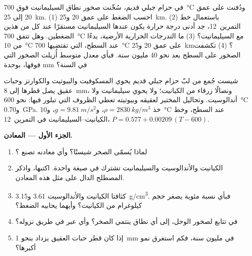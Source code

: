 \begin{exercise}[$\star\star\star$]\label{exo:g12:metamorphic-rocks:15}
في حزام جبلي قديم، سُخّنت صخور نطاق السيليمانيت فوق
\qty{700}{\celsius} ودُفنت على عمق 20 إلى \qty{25}{km}. (1) احسب
الضغط على عمق 20 و\qty{25}{km}. (2) باستعمال خط
التمرين~12، جد أدنى درجة حرارة يكون عندها السيليمانيت مستقرًا عند
كل من هذين الضغطين. وهل تتفق \qty{700}{\celsius} مع السيليمانيت؟
(3) ما التدرجات الحرارية الأرضية، بدءًا من \qty{10}{\celsius} عند السطح، التي تقتضيها
\qty{700}{\celsius} على عمق 20 و\qty{25}{km}؟ (4) تكشفت الصخور
على السطح بعد نحو 40 مليون سنة. فبأي معدل متوسط أُزيلت
الصخور التي فوقها، بوحدة \unit{mm} في السنة؟
\end{exercise}

\begin{problem}
\label{pb:g12:metamorphic-rocks:1}
شيست جُمع من لبّ حزام جبلي قديم يحوي المسكوفيت
والبيوتيت والكوارتز وحبات عقيق يصل قطرها إلى \qty{8}{mm}، ونصالًا زرقاء من
الكيانيت؛ ولا يحوي سيليمانيت ولا أندالوسيت. وتحاليل المختبر
لعقيقه وبيوتيته تعطي الظروف التي تبلور فيها:
نحو \qty{600}{\celsius} و\qty{0.70}{GPa}. خذ $\rho =
\qty{2830}{kg/m^3}$، و$g = \qty{9.81}{m/s^2}$، و\qty{10}{\celsius} عند
السطح، وخط الكيانيت--السيليمانيت في التمرين~12، $P = 0.577 +
0.00209\,(T - 600)$.

\medskip
\noindent\textbf{الجزء الأول --- المعادن.}
\begin{enumerate}
  \item لماذا يُسمّى الصخر شيستًا؟ وأي معادنه تصنع
        ؟
  \item الكيانيت والأندالوسيت والسيليمانيت تشترك في صيغة واحدة. اكتبها،
        واذكر المصطلح الدال على مثل هذه المعادن.
  \item كثافتا الكيانيت والأندالوسيت \num{3.61}
        و\qty{3.15}{g/cm^3}. فبأي نسبة مئوية يصغر حجم كيلوغرام من
        الكيانيت؟ وأيهما يحابيه الضغط؟
  \item في تتابع  لصخور الوحل، إلى أي نطاق
        ينتمي الصخر؟ وأي  عبر في طريق نزوله؟
  \item إذا كان قطر حبات العقيق يزداد بنحو \qty{1}{mm} في مليون
        سنة، فكم استغرق نمو أكبرها؟
\end{enumerate}


\end{problem}
